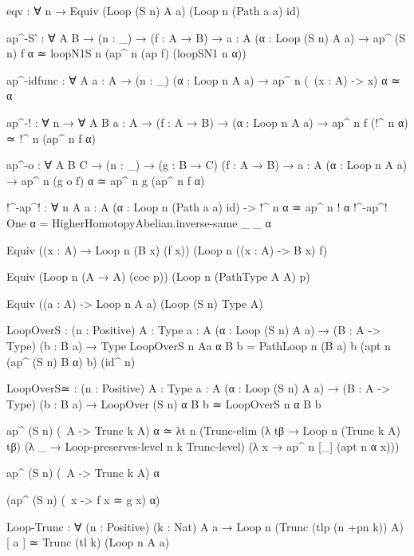 {  eqv : ∀ n → Equiv (Loop (S n) A a) (Loop n (Path a a) id) 

  ap^-S' : ∀ {A B} → (n : _) → (f : A → B) → {a : A} 
                    (α : Loop (S n) A a)
                  → ap^ (S n) f α ≃ loopN1S n (ap^ n (ap f) (loopSN1 n α))

  ap^-idfunc : ∀ {A} {a : A} → (n : _) (α : Loop n A a) → ap^ n (\ (x : A) -> x) α ≃ α

  ap^-! : ∀ n → ∀ {A B} {a : A} → (f : A → B) → (α : Loop n A a)
          → ap^ n f (!^ n α) ≃ !^ n (ap^ n f α)

  ap^-o : ∀ {A B C} → (n : _) → (g : B → C) (f : A → B)
          → {a : A} (α : Loop n A a)
          → ap^ n (g o f) α ≃ ap^ n g (ap^ n f α) 
  
  
  !^-ap^! : ∀ n {A} {a : A} (α : Loop n (Path a a) id) -> !^ n α ≃ ap^ n ! α
  !^-ap^! One α = HigherHomotopyAbelian.inverse-same _ _ α

  
  Equiv ((x : A) → Loop n (B x) (f x)) (Loop n ((x : A) -> B x) f)

  Equiv (Loop n (A → A) (coe p)) (Loop n (Path{Type} A A) p)

  Equiv ((a : A) -> Loop n A a) (Loop (S n) Type A)

  LoopOverS :  (n : Positive) {A : Type} {a : A} (α : Loop (S n) A a) 
             → (B : A -> Type) (b : B a) → Type
  LoopOverS n {A}{a} α B b = 
    Path{Loop n (B a) b} 
        (apt n (ap^ (S n) B α) b)
        (id^ n)

    LoopOverS≃ : (n : Positive) {A : Type} {a : A} (α : Loop (S n) A a) → (B : A -> Type) (b : B a) 
               → LoopOver (S n) α B b ≃ LoopOverS n α B b 

    ap^ (S n) (\ A -> Trunc k A) α ≃ λt n (Trunc-elim (λ tβ → Loop n (Trunc k A) tβ)
                                                      (λ _ → Loop-preserves-level n k Trunc-level) 
                                                      (λ x → ap^ n [_] (apt n α x))) 

    ap^ (S n) (\ A -> Trunc k A) α

    (ap^ (S n) (\ x -> f x ≃ g x) α)

    Loop-Trunc : ∀ (n : Positive) (k : Nat) {A} {a} → Loop n (Trunc (tlp (n +pn k)) A) [ a ] ≃ Trunc (tl k) (Loop n A a)
}

